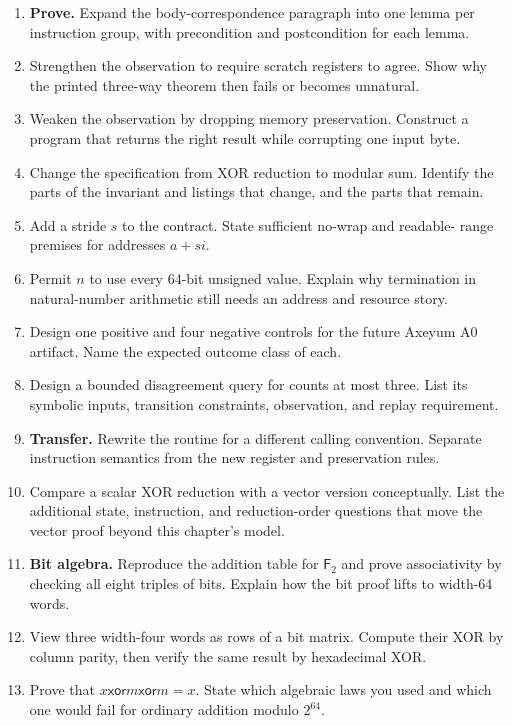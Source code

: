 \begin{enumerate}
state after . Include the temporary loaded word.
\item \textbf{Prove.} Expand the body-correspondence paragraph into one lemma
per instruction group, with precondition and postcondition for each lemma.
\item Strengthen the observation to require scratch registers to agree. Show
why the printed three-way theorem then fails or becomes unnatural.
\item Weaken the observation by dropping memory preservation. Construct a
program that returns the right result while corrupting one input byte.
\item Change the specification from XOR reduction to modular sum. Identify the
parts of the invariant and listings that change, and the parts that remain.
\item Add a stride \(s\) to the contract. State sufficient no-wrap and readable-
range premises for addresses \(a+si\).
\item Permit \(n\) to use every 64-bit unsigned value. Explain why termination
in natural-number arithmetic still needs an address and resource story.
\item Design one positive and four negative controls for the future Axeyum A0
artifact. Name the expected outcome class of each.
\item Design a bounded disagreement query for counts at most three. List its
symbolic inputs, transition constraints, observation, and replay requirement.
\item \textbf{Transfer.} Rewrite the routine for a different calling convention.
Separate instruction semantics from the new register and preservation rules.
\item Compare a scalar XOR reduction with a vector version conceptually. List
the additional state, instruction, and reduction-order questions that move the
vector proof beyond this chapter's model.

\item \textbf{Bit algebra.} Reproduce the addition table for \(\mathsf{F}_2\)
and prove associativity by checking all eight triples of bits. Explain how the
bit proof lifts to width-64 words.

\item View three width-four words as rows of a bit matrix. Compute their XOR by
column parity, then verify the same result by hexadecimal XOR.

\item Prove that \(x\mathbin{\mathsf{xor}}m\mathbin{\mathsf{xor}}m=x\).
State which algebraic laws you used and which one would fail for ordinary
addition modulo \(2^{64}\).


\end{enumerate}
